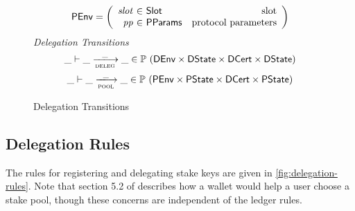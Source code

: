 \begin{figure}
\begin{equation*}
    \PEnv =
    \left(
      \begin{array}{r@{~\in~}lr}
        \var{slot} & \Slot & \text{slot}\\
        \var{pp} & \PParams & \text{protocol parameters}\\
      \end{array}
    \right)
  \end{equation*}
  \emph{Delegation Transitions}
  \begin{equation*}
    \_ \vdash \_ \trans{deleg}{\_} \_ \in
      \powerset (\DEnv \times \DState \times \DCert \times \DState)
  \end{equation*}
  \begin{equation*}
    \_ \vdash \_ \trans{pool}{\_} \_ \in
    \powerset (\PEnv \times \PState \times \DCert \times \PState)
  \end{equation*}
  \caption{Delegation Transitions}
  \label{fig:delegation-transitions}
\end{figure}

\clearpage

\subsection{Delegation Rules}
\label{sec:deleg-rules}


The rules for registering and delegating stake keys are given in \cref{fig:delegation-rules}.
Note that section 5.2 of \cite{delegation_design} describes how a wallet would help a user choose
a stake pool, though these concerns are independent of the ledger rules.

